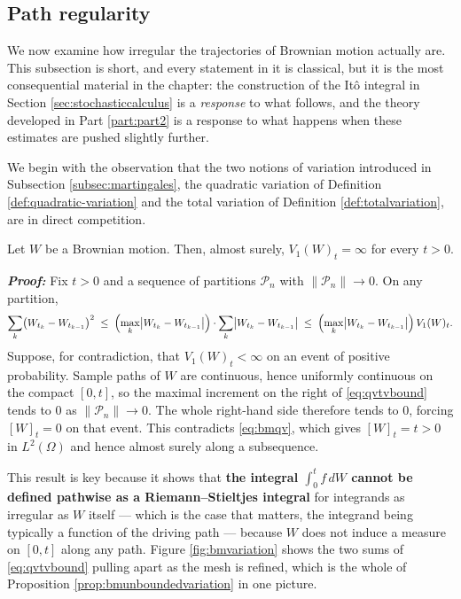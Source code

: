 \newpage

\subsection{Path regularity}\label{subsec:pathregularity}

We now examine how irregular the trajectories of Brownian motion actually are. This subsection is 
short, and every statement in it is classical, but it is the most consequential material in the 
chapter: the construction of the Itô integral in Section \ref{sec:stochasticcalculus} is a 
\emph{response} to what follows, and the theory developed in Part \ref{part:part2} is a response 
to what happens when these estimates are pushed slightly further.

We begin with the observation that the two notions of variation introduced in Subsection
\ref{subsec:martingales}, the quadratic variation of Definition \ref{def:quadratic-variation} and
the total variation of Definition \ref{def:totalvariation}, are in direct competition.

\begin{proposition}\label{prop:bmunboundedvariation}
Let $W$ be a Brownian motion. Then, almost surely, $V_1(W)_t = \infty$ for every $t > 0$.
\end{proposition}

\textbf{\textit{Proof:}} Fix $t>0$ and a sequence of partitions $\mathcal{P}_n$ with 
$\lVert\mathcal{P}_n\rVert \to 0$. On any partition,
\begin{equation}\label{eq:qvtvbound}
\sum_{k} \bigl(W_{t_k} - W_{t_{k-1}}\bigr)^2 
\;\leq\; \Bigl(\max_{k} \bigl|W_{t_k} - W_{t_{k-1}}\bigr|\Bigr) \cdot \sum_{k}\bigl|W_{t_k}-W_{t_{k-1}}\bigr|
\;\leq\; \Bigl(\max_{k}\bigl|W_{t_k}-W_{t_{k-1}}\bigr|\Bigr)\, V_1(W)_t .
\end{equation}
Suppose, for contradiction, that $V_1(W)_t < \infty$ on an event of positive probability. Sample 
paths of $W$ are continuous, hence uniformly continuous on the compact $[0,t]$, so the maximal 
increment on the right of \eqref{eq:qvtvbound} tends to $0$ as $\lVert\mathcal{P}_n\rVert \to 0$. 
The whole right-hand side therefore tends to $0$, forcing $[W]_t = 0$ on that event. This 
contradicts \eqref{eq:bmqv}, which gives $[W]_t = t > 0$ in $L^2(\Omega)$ and hence almost surely 
along a subsequence. \qedfilledtext

This result is key because it shows that \textbf{the integral $\int_0^t f\,dW$ cannot be defined pathwise as a
Riemann--Stieltjes integral} for integrands as irregular as $W$ itself --- which is the case that matters, the integrand being typically a function of the driving path --- because $W$ does not induce
a measure on $[0,t]$ along any path. Figure \ref{fig:bmvariation} shows the two sums of
\eqref{eq:qvtvbound} pulling apart as the mesh is refined, which is the whole of Proposition
\ref{prop:bmunboundedvariation} in one picture.

